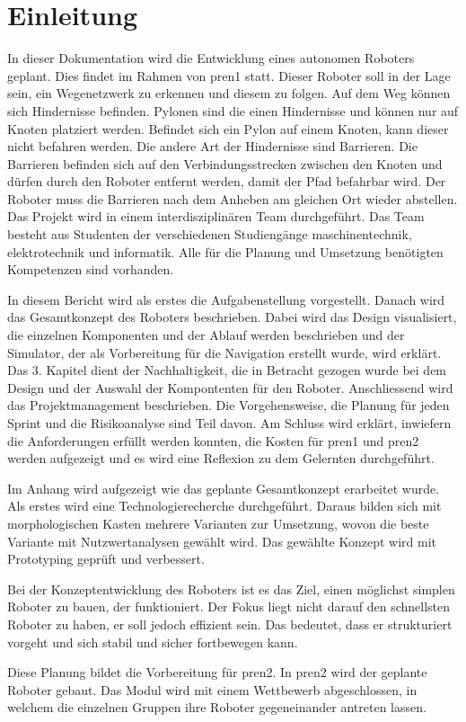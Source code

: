 \section{Einleitung}

In dieser Dokumentation wird die Entwicklung eines autonomen Roboters geplant. Dies findet im Rahmen von \acrfull{pren1} statt. Dieser Roboter soll in der Lage sein, ein Wegenetzwerk zu erkennen und diesem zu folgen. Auf dem Weg können sich Hindernisse befinden. Pylonen sind die einen Hindernisse und können nur auf Knoten platziert werden. Befindet sich ein Pylon auf einem Knoten, kann dieser nicht befahren werden. Die andere Art der Hindernisse sind Barrieren. Die Barrieren befinden sich auf den Verbindungsstrecken zwischen den Knoten und dürfen durch den Roboter entfernt werden, damit der Pfad befahrbar wird. Der Roboter muss die Barrieren nach dem Anheben am gleichen Ort wieder abstellen. 
Das Projekt wird in einem interdisziplinären Team durchgeführt. Das Team besteht aus Studenten der verschiedenen Studiengänge \acrfull{maschinentechnik}, \acrfull{elektrotechnik} und \acrfull{informatik}. Alle für die Planung und Umsetzung benötigten Kompetenzen sind vorhanden.

In diesem Bericht wird als erstes die Aufgabenstellung vorgestellt. Danach wird das Gesamtkonzept des Roboters beschrieben. Dabei wird das Design visualisiert, die einzelnen Komponenten und der Ablauf werden beschrieben und der Simulator, der als Vorbereitung für die Navigation erstellt wurde, wird erklärt. Das 3. Kapitel dient der Nachhaltigkeit, die in Betracht gezogen wurde bei dem Design und der Auswahl der Kompontenten für den Roboter. Anschliessend wird das Projektmanagement beschrieben. Die Vorgehensweise, die Planung für jeden Sprint und die Risikoanalyse sind Teil davon.
Am Schluss wird erklärt, inwiefern die Anforderungen erfüllt werden konnten, die Kosten für \acrfull{pren1} und \acrfull{pren2} werden aufgezeigt und es wird eine Reflexion zu dem Gelernten durchgeführt.

Im Anhang wird aufgezeigt wie das geplante Gesamtkonzept erarbeitet wurde. Als erstes wird eine Technologierecherche durchgeführt. Daraus bilden sich mit morphologischen Kasten mehrere Varianten zur Umsetzung, wovon die beste Variante mit Nutzwertanalysen gewählt wird. Das gewählte Konzept wird mit Prototyping geprüft und verbessert.

Bei der Konzeptentwicklung des Roboters ist es das Ziel, einen möglichst simplen Roboter zu bauen, der funktioniert. Der Fokus liegt nicht darauf den schnellsten Roboter zu haben, er soll jedoch effizient sein. Das bedeutet, dass er strukturiert vorgeht und sich stabil und sicher fortbewegen kann.

Diese Planung bildet die Vorbereitung für \acrshort{pren2}. In \acrshort{pren2} wird der geplante Roboter gebaut. Das Modul wird mit einem Wettbewerb abgeschlossen, in welchem die einzelnen Gruppen ihre Roboter gegeneinander antreten lassen.

